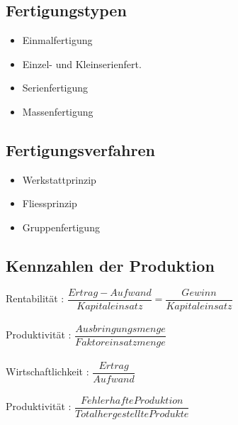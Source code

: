 \documentclass[../ZF_Wing.tex]{subfiles}
\begin{document}
\subsection{Fertigungstypen}
\begin{itemize}
	\item Einmalfertigung
	\item Einzel- und Kleinserienfert.
	\item Serienfertigung
	\item Massenfertigung
\end{itemize}

\subsection{Fertigungsverfahren}
\begin{itemize}
	\item Werkstattprinzip
	\item Fliessprinzip
	\item Gruppenfertigung
\end{itemize}


\subsection{Kennzahlen der Produktion}
Rentabilität : $\dfrac{Ertrag - Aufwand}{Kapitaleinsatz} = \dfrac{Gewinn}{Kapitaleinsatz}$\\\\
Produktivität : $\dfrac{Ausbringungsmenge}{Faktoreinsatzmenge}$\\\\
Wirtschaftlichkeit : $\dfrac{Ertrag}{Aufwand}$\\\\
Produktivität : $\dfrac{Fehlerhafte Produktion}{Total hergestellte Produkte}$\\\\
\end{document}
